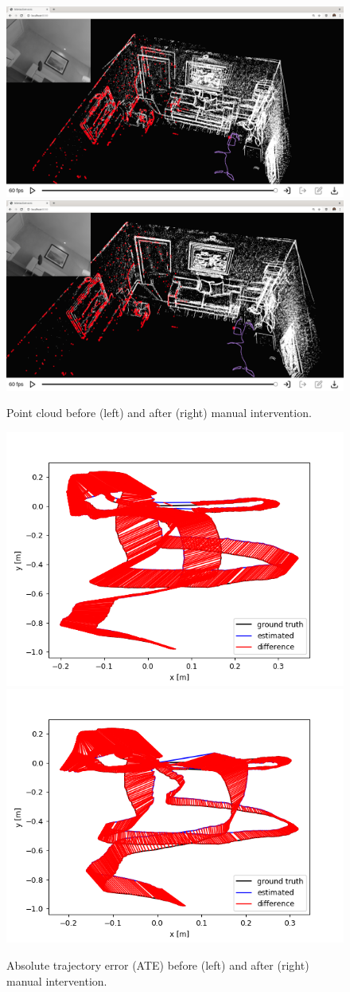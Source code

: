 \begin{figure}[ht]
	\centering
	\includegraphics[width=0.48\linewidth]{assets/img/vors-drift-before.png}
	\hfill
	\includegraphics[width=0.48\linewidth]{assets/img/vors-drift-after.png}
	\caption{Point cloud before (left) and after (right) manual intervention.}%
	\label{fig:interactive-vors-intervention}
\end{figure}

\begin{figure}[ht]
	\centering
	\includegraphics[width=0.48\linewidth]{assets/img/ate-vors.png}
	\hfill
	\includegraphics[width=0.48\linewidth]{assets/img/ate-vors-interactive.png}
	\caption{Absolute trajectory error (ATE) before (left) and after (right) manual intervention.}%
	\label{fig:ate-plot}
\end{figure}

